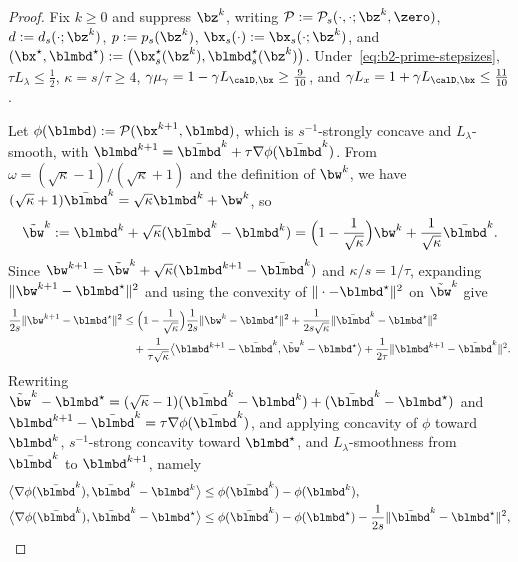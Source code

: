 \begin{proof}
Fix \(k\ge0\) and suppress \(\bz^k\), writing
\(\mathcal P:=\mathcal P_s(\cdot,\cdot;\bz^k,\zero)\), \(d:=d_s(\cdot;\bz^k)\),
\(p:=p_s(\bz^k)\), \(\bx_s(\cdot):=\bx_s(\cdot;\bz^k)\), and
\((\bx^\star,\blmbd^\star):=\bigl(\bx_s^\star(\bz^k),\blmbd_s^\star(\bz^k)\bigr)\).
Under~\eqref{eq:b2-prime-stepsizes}, \(\tau L_\lambda\le\frac12\),
\(\kappa=s/\tau\ge4\), \(\gamma\mu_\gamma=1-\gamma L_{\calD,\bx}\ge\frac{9}{10}\),
and \(\gamma L_x=1+\gamma L_{\calD,\bx}\le\frac{11}{10}\).

Let \(\phi(\blmbd):=\mathcal P(\bx^{k+1},\blmbd)\), which is
\(s^{-1}\)-strongly concave and \(L_\lambda\)-smooth, with
\(\blmbd^{k+1}=\bar{\blmbd}^k+\tau\nabla\phi(\bar{\blmbd}^k)\). From
\(\omega=(\sqrt{\kappa}-1)/(\sqrt{\kappa}+1)\) and the definition of \(\bw^k\),
we have \((\sqrt{\kappa}+1)\bar{\blmbd}^k=\sqrt{\kappa}\blmbd^k+\bw^k\), so
\[
    \tilde{\bw}^k:=\blmbd^k+\sqrt{\kappa}(\bar{\blmbd}^k-\blmbd^k)
    =\Bigl(1-\frac{1}{\sqrt{\kappa}}\Bigr)\bw^k
    +\frac{1}{\sqrt{\kappa}}\bar{\blmbd}^k .
\]
Since \(\bw^{k+1}=\tilde{\bw}^k+\sqrt{\kappa}(\blmbd^{k+1}-\bar{\blmbd}^k)\)
and \(\kappa/s=1/\tau\), expanding \(\|\bw^{k+1}-\blmbd^\star\|^2\) and using
the convexity of \(\|\cdot-\blmbd^\star\|^2\) on \(\tilde{\bw}^k\) give
\[
\begin{aligned}
    \frac{1}{2s}\|\bw^{k+1}-\blmbd^\star\|^2
    &\le\Bigl(1-\frac{1}{\sqrt{\kappa}}\Bigr)
    \frac{1}{2s}\|\bw^k-\blmbd^\star\|^2
    +\frac{1}{2s\sqrt{\kappa}}\|\bar{\blmbd}^k-\blmbd^\star\|^2\\
    &\quad+\frac{1}{\tau\sqrt{\kappa}}
    \bigl\langle\blmbd^{k+1}-\bar{\blmbd}^k,\tilde{\bw}^k-\blmbd^\star\bigr\rangle
    +\frac{1}{2\tau}\|\blmbd^{k+1}-\bar{\blmbd}^k\|^2 .
\end{aligned}
\]
Rewriting \(\tilde{\bw}^k-\blmbd^\star
=(\sqrt{\kappa}-1)(\bar{\blmbd}^k-\blmbd^k)+(\bar{\blmbd}^k-\blmbd^\star)\)
and \(\blmbd^{k+1}-\bar{\blmbd}^k=\tau\nabla\phi(\bar{\blmbd}^k)\), and
applying concavity of \(\phi\) toward \(\blmbd^k\), \(s^{-1}\)-strong concavity
toward \(\blmbd^\star\), and \(L_\lambda\)-smoothness from \(\bar{\blmbd}^k\) to
\(\blmbd^{k+1}\), namely
\[
\begin{aligned}
    \bigl\langle\nabla\phi(\bar{\blmbd}^k),\bar{\blmbd}^k-\blmbd^k\bigr\rangle
    &\le\phi(\bar{\blmbd}^k)-\phi(\blmbd^k),\\
    \bigl\langle\nabla\phi(\bar{\blmbd}^k),\bar{\blmbd}^k-\blmbd^\star\bigr\rangle
    &\le\phi(\bar{\blmbd}^k)-\phi(\blmbd^\star)
    -\frac{1}{2s}\|\bar{\blmbd}^k-\blmbd^\star\|^2,\\

\end{aligned}\]
\end{proof}
